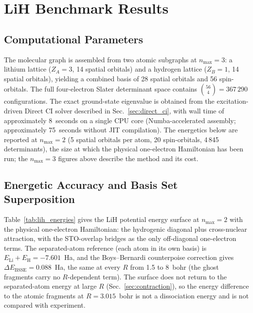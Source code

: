 \documentclass[aps,pra,twocolumn,superscriptaddress,longbibliography]{revtex4-2}
\begin{document}
\section{LiH Benchmark Results}
\label{sec:results}

\subsection{Computational Parameters}
\label{sec:params}

The molecular graph is assembled from two atomic subgraphs at
$n_{\max}=3$: a lithium lattice ($Z_A=3$, 14 spatial orbitals) and a
hydrogen lattice ($Z_B=1$, 14 spatial orbitals), yielding a combined
basis of 28 spatial orbitals and 56 spin-orbitals.  The full
four-electron Slater determinant space contains $\binom{56}{4} =
367\,290$ configurations.  The exact ground-state eigenvalue is obtained
from the excitation-driven Direct CI solver described in
Sec.~\ref{sec:direct_ci}, with wall time of approximately 8~seconds on
a single CPU core (Numba-accelerated assembly; approximately 75~seconds
without JIT compilation).  The energetics below are reported at
$n_{\max}=2$ (5 spatial orbitals per atom, 20 spin-orbitals, 4\,845
determinants), the size at which the physical one-electron Hamiltonian
has been run; the $n_{\max}=3$ figures above describe the method and
its cost.

\subsection{Energetic Accuracy and Basis Set Superposition}
\label{sec:energy}

Table~\ref{tab:lih_energies} gives the LiH potential energy surface at
$n_{\max}=2$ with the physical one-electron Hamiltonian: the hydrogenic
diagonal plus cross-nuclear attraction, with the STO-overlap bridges as
the only off-diagonal one-electron terms.  The separated-atom reference
(each atom in its own basis) is $E_{\mathrm{Li}}+E_{\mathrm{H}} =
-7.601$~Ha, and the Boys--Bernardi counterpoise correction gives
$\Delta E_{\mathrm{BSSE}} = 0.088$~Ha, the same at every $R$ from 1.5 to
8~bohr (the ghost fragments carry no $R$-dependent term).  The surface does not return to
the separated-atom energy at large $R$ (Sec.~\ref{sec:contraction}), so
the energy difference to the atomic fragments at $R=3.015$~bohr is not a
dissociation energy and is not compared with experiment.
\end{document}
